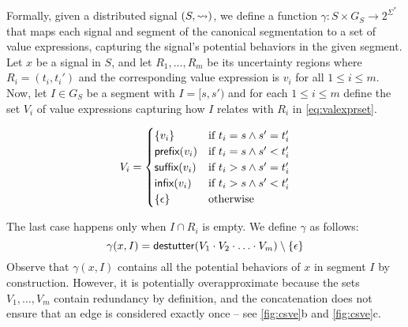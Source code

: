 Formally, given a distributed signal $(S,{\rightsquigarrow})$, we define a function $\gamma : S \times G_S \to 2^{\Sigma^*}$ that maps each signal and segment of the canonical segmentation to a set of value expressions, capturing the signal's potential behaviors in the given segment.
Let $x$ be a signal in $S$, and let $R_1, \ldots, R_m$ be its uncertainty regions where $R_i = (t_i, t_i')$ and the corresponding value expression is $v_i$ for all $1 \leq i \leq m$.
Now, let $I \in G_S$ be a segment with $I = [s, s')$ and for each $1 \leq i \leq m$ define the set $V_i$ of value expressions capturing how $I$ relates with $R_i$ in \cref{eq:valexprset}.
%
\begin{figure}
	\begin{equation} \label{eq:valexprset}
		V_i = 
		\begin{cases}
			\{v_i\} & \text{if } t_i = s \land s' = t_i' \\
			\textsf{prefix}(v_i) & \text{if } t_i = s \land s' < t_i' \\
			\textsf{suffix}(v_i) & \text{if } t_i > s \land s' = t_i' \\
			\textsf{infix}(v_i) & \text{if } t_i > s \land s' < t_i' \\
			\{\epsilon\} & \text{otherwise}
		\end{cases}
	\end{equation}
\end{figure}
The last case happens only when \( I \cap R_i \) is empty.
We define \(\gamma\) as follows:
\[ \gamma(x,I) = \mathsf{destutter}(V_1 \cdot V_2 \cdot \ldots \cdot V_m) \setminus \{\epsilon\} \]
Observe that \(\gamma(x,I)\) contains all the potential behaviors of \( x \) in segment \( I \) by construction.
However, it is potentially overapproximate because the sets \( V_1, \ldots, V_m \) contain redundancy by definition, and the concatenation does not ensure that an edge is considered exactly once -- see \cref{fig:csve}b and \cref{fig:csve}c.





